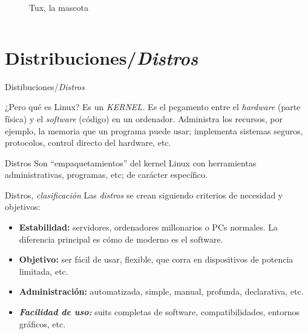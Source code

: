 \documentclass[12pt]{beamer}
\begin{document}
\begin{frame}
\begin{columns}
\begin{column}{0.5\linewidth}
\begin{figure}
				\caption{Tux, la mascota}
			\end{figure}
		\end{column}
	\end{columns}
\end{frame}

\section{Distribuciones/\textit{Distros}}
\begin{frame}{Distibuciones/\textit{Distros}}
	\begin{block}{¿Pero qué es Linux?}
		Es un \textit{KERNEL.} Es el pegamento entre el \textit{hardware} (parte física) y el \textit{software} (código) en un ordenador. Administra los recursos, por ejemplo, la memoria que un programa puede usar; implementa sistemas seguros, protocolos, control directo del hardware, etc.
	\end{block}
	\begin{block}{Distros}
		Son ``empaquetamientos'' del kernel Linux con herramientas administrativas, programas, etc; de carácter específico.
	\end{block}
\end{frame}

\begin{frame}{Distros, \textit{clasificación}}
	Las \textit{distros} se crean siguiendo criterios de necesidad y objetivos:
	\begin{itemize}
		\item \textbf{Estabilidad:} servidores, ordenadores millonarios o PCs normales. La diferencia principal es cómo de moderno es el software.
		\item \textbf{Objetivo:} ser fácil de usar, flexible, que corra en dispositivos de potencia limitada, etc.
		\item \textbf{Administración:} automatizada, simple, manual, profunda, declarativa, etc.
		\item \textbf{\textit{Facilidad de uso:}} suits completas de software, compatibilidades, entornos gráficos, etc.
	\end{itemize}
\end{frame}
\end{document}
